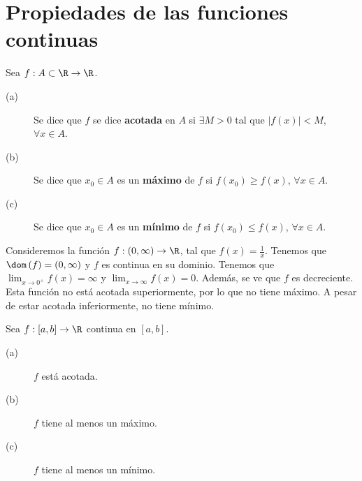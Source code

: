 \section{Propiedades de las funciones continuas}
\begin{fdefinition}[]
\normalfont Sea $\displaystyle f : A \subset \R \to \R $.
\begin{description}
\item[(a)] Se dice que $\displaystyle f $ se dice \textbf{acotada} en $\displaystyle A $ si $\displaystyle \exists M > 0 $ tal que $\displaystyle \left|f\left(x\right)\right| < M $, $\displaystyle \forall x \in A $.
\item[(b)] Se dice que $\displaystyle x_{0} \in A $ es un \textbf{máximo} de $\displaystyle f $ si $\displaystyle f\left(x_{0}\right) \geq f\left(x\right) $, $\displaystyle \forall x \in A $.
\item[(c)] Se dice que $\displaystyle x_{0} \in A $ es un \textbf{mínimo} de $\displaystyle f $ si $\displaystyle f\left(x_{0}\right) \leq f\left(x\right)$, $\displaystyle \forall x \in A $.
\end{description}
\end{fdefinition}
\begin{eg}
\normalfont Consideremos la función $\displaystyle f: \left(0,\infty\right) \to \R $, tal que $\displaystyle f\left(x\right) = \frac{1}{x} $. Tenemos que $\displaystyle \dom\left(f\right)=\left(0,\infty\right) $ y $\displaystyle f $ es continua en su dominio. Tenemos que $\displaystyle \lim_{x \to 0^{+}}f\left(x\right) = \infty $ y $\displaystyle \lim_{x \to \infty}f\left(x\right) = 0 $. Además, se ve que $\displaystyle f $ es decreciente. Esta función no está acotada superiormente, por lo que no tiene máximo. A pesar de estar acotada inferiormente, no tiene mínimo.
\end{eg}
\begin{ftheorem}[]
	\normalfont Sea $\displaystyle f: [a,b] \to \R $ continua en $\displaystyle [a,b] $.
	\begin{description}
	\item[(a)] $\displaystyle f $ está acotada.
	\item[(b)] $\displaystyle f $ tiene al menos un máximo.
	\item[(c)] $\displaystyle f $ tiene al menos un mínimo.
	\end{description}
\end{ftheorem}
